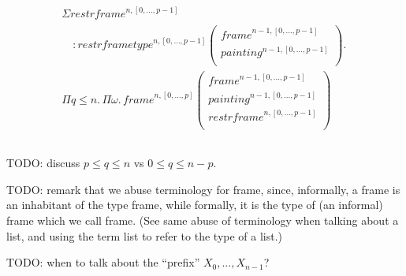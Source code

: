 \documentclass{article}
\newcommand{\myframe}{\mathit{frame}}
\newcommand{\painting}{\mathit{painting}}
\newcommand{\restrframe}{\mathit{restrframe}}
\newcommand{\restrframetype}{\mathit{restrframetype}}
\begin{document}
\begin{enumerate}
$$\begin{array}{llcl}
\begin{array}{l}
              \Sigma \restrframe^{n,[0,...,p-1]}                            \\
              \quad:\restrframetype^{n,[0,...,p-1]}
              \left(\begin{array}{l}
                        \myframe^{n-1,[0,...,p-1]}  \\
                        \painting^{n-1,[0,...,p-1]} \\
                      \end{array}\right)
              .\,                                                           \\
              \Pi q\leq n.\,\Pi \omega.\,\myframe^{n,[0,...,p]}
              \left(\begin{array}{l}
                        \myframe^{n-1,[0,...,p-1]}  \\
                        \painting^{n-1,[0,...,p-1]} \\
                        \restrframe^{n,[0,...,p-1]} \\
                      \end{array}\right) \\
            \end{array} \\
          \end{array}
        $$

        TODO: discuss $p\leq q \leq n$ vs $0 \leq q \leq n-p$.

        TODO: remark that we abuse terminology for frame, since, informally, a
        frame is an inhabitant of the type frame, while formally, it is the
        type of (an informal) frame which we call frame. (See same abuse of
        terminology when talking about a list, and using the term list to
        refer to the type of a list.)

        TODO: when to talk about the ``prefix'' $X_0, ..., X_{n-1}$?



\end{enumerate}
\end{document}
